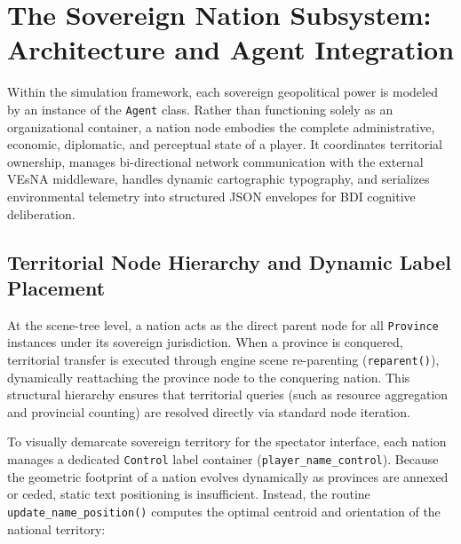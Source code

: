 \section{The Sovereign Nation Subsystem: Architecture and Agent Integration}
\label{sec:nation_subsystem}

Within the simulation framework, each sovereign geopolitical power is modeled by an instance of the \texttt{Agent} class. Rather than functioning solely as an organizational container, a nation node embodies the complete administrative, economic, diplomatic, and perceptual state of a player. It coordinates territorial ownership, manages bi-directional network communication with the external VEsNA middleware, handles dynamic cartographic typography, and serializes environmental telemetry into structured JSON envelopes for BDI cognitive deliberation.

\subsection{Territorial Node Hierarchy and Dynamic Label Placement}
\label{subsec:nation_hierarchy_labels}

At the scene-tree level, a nation acts as the direct parent node for all \texttt{Province} instances under its sovereign jurisdiction. When a province is conquered, territorial transfer is executed through engine scene re-parenting (\texttt{reparent()}), dynamically reattaching the province node to the conquering nation. This structural hierarchy ensures that territorial queries (such as resource aggregation and provincial counting) are resolved directly via standard node iteration.

To visually demarcate sovereign territory for the spectator interface, each nation manages a dedicated \texttt{Control} label container (\texttt{player\_name\_control}). Because the geometric footprint of a nation evolves dynamically as provinces are annexed or ceded, static text positioning is insufficient. Instead, the routine \texttt{update\_name\_position()} computes the optimal centroid and orientation of the national territory:

